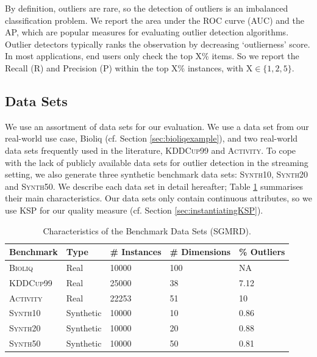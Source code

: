 By definition, outliers are rare, so the detection of outliers is an imbalanced classification problem. We report the area under the \gls{ROC} curve (\acrshort{AUC}) and the \gls{AP}, which are popular measures for evaluating outlier detection algorithms. 
Outlier detectors typically ranks the observation by decreasing `outlierness' score. In most applications, end users only check the top X\% items. 
So we report the Recall (R) and Precision (P) within the top X\% instances, with $\text{X} \in \{1,2,5\}$. 

\subsection{Data Sets}

We use an assortment of data sets for our evaluation. We use a data set from our real-world use case, \acrshort{Bioliq} (cf. Section \ref{sec:bioliqexample}), and two real-world data sets frequently used in the literature, \textsc{KDDCup99} and \textsc{Activity}. To cope with the lack of publicly available data sets for outlier detection in the streaming setting, we also generate three synthetic benchmark data sets: \textsc{Synth10}, \textsc{Synth20} and \textsc{Synth50}. 
We describe each data set in detail hereafter; Table \ref{tab:databenchmark} summarises their main characteristics. Our data sets only contain continuous attributes, so we use \acrshort{KSP} for our quality measure (cf. Section \ref{sec:instantiatingKSP}). 

\begin{table}[ht]
	\caption{Characteristics of the Benchmark Data Sets (\gls{SGMRD}).}
	\label{tab:databenchmark}
	\footnotesize
	\centering
	\renewcommand{\arraystretch}{1.2}
	\begin{tabularx}{0.9\columnwidth}{l|XXXX}
		Benchmark      & Type  & \# Instances & \# Dimensions & \% Outliers \\ \toprule
		\textsc{Bioliq} & Real & \num{10000}      & 100       & NA                      \\ 
		\textsc{KDDCup99} & Real & \num{25000}      & 38       & 7.12                    \\ 
		\textsc{Activity} & Real & 22253      & 51       & 10                     \\ \midrule
		\textsc{Synth10} & Synthetic & \num{10000}      & 10       & 0.86                 \\ 
		\textsc{Synth20} & Synthetic& \num{10000}      & 20       & 0.88               \\ 
		\textsc{Synth50} & Synthetic & \num{10000}      & 50       & 0.81                 \\ \bottomrule
	\end{tabularx}
\end{table}

